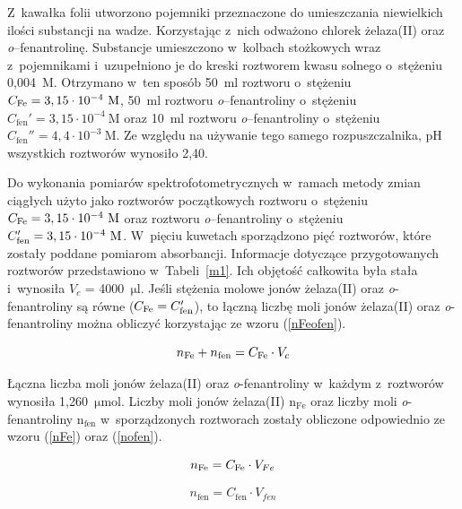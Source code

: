 \documentclass[12pt]{article}
\begin{document}
Z~kawałka folii utworzono pojemniki przeznaczone do umieszczania niewielkich ilości substancji na wadze. Korzystając z~nich odważono
chlorek żelaza(II) oraz \textit{o}--fenantrolinę. Substancje umieszczono w~kolbach stożkowych wraz z~pojemnikami i~uzupełniono je do kreski roztworem kwasu solnego o~stężeniu 0,004~M. Otrzymano w~ten sposób 50~ml roztworu  o~stężeniu $C_{\ce{Fe}}= \mathrm{3,15 \cdot 10^{-4}~M}$, 50~ml roztworu \textit{o}--fenantroliny o~stężeniu $C_{\mathrm{fen}}' = \mathrm{3,15 \cdot 10^{-4}~M}$ oraz 10~ml roztworu \textit{o}--fenantroliny o~stężeniu $C_{\mathrm{fen}}'' = \mathrm{4,4 \cdot 10^{-3}~M}$. Ze względu na używanie tego samego rozpuszczalnika, pH wszystkich roztworów wynosiło 2,40.

Do wykonania pomiarów spektrofotometrycznych w~ramach metody zmian ciągłych użyto jako roztworów początkowych roztworu  o~stężeniu $C_{\ce{Fe}}= \mathrm{3,15 \cdot 10^{-4}~M}$ oraz roztworu \textit{o}--fenantroliny o~stężeniu $C_{\ce{fen}}'= \mathrm{3,15 \cdot 10^{-4}~M}$. W~pięciu kuwetach sporządzono pięć roztworów, które zostały poddane pomiarom absorbancji. Informacje dotyczące przygotowanych roztworów przedstawiono w~Tabeli~\ref{m1}. Ich objętość całkowita była stała i~wynosiła $V_c$ = 4000~$\mathrm{\mu l}$. Jeśli stężenia molowe jonów żelaza(II) oraz \textit{o}-fenantroliny są równe ($C_{\ce{Fe}}=C_{\ce{fen}}'$), to łączną liczbę moli jonów żelaza(II) oraz \textit{o}-fenantroliny można obliczyć korzystając ze wzoru (\ref{nFeofen}).

\begin{equation}
    n_{\mathrm{Fe}} + n_{\mathrm{fen}} = C_{\ce{Fe}} \cdot V_c
    \label{nFeofen}
\end{equation}

\noindent Łączna liczba moli jonów żelaza(II) oraz \textit{o}-fenantroliny w~każdym z~roztworów wynosiła 1,260~$\mathrm{\mu mol}$. Liczby moli jonów żelaza(II) $\mathrm{n_{Fe}}$ oraz liczby moli \textit{o}-fenantroliny $\mathrm{n_{fen}}$ w~sporządzonych roztworach zostały obliczone odpowiednio ze wzoru (\ref{nFe}) oraz (\ref{nofen}).

\begin{equation}
    n_{\mathrm{Fe}} = C_{\ce{Fe}} \cdot V_{Fe}
    \label{nFe}
\end{equation}

\begin{equation}
    n_{\mathrm{fen}} = C_{\mathrm{fen}} \cdot V_{fen}
    \label{nofen}
\end{equation}
\end{document}

